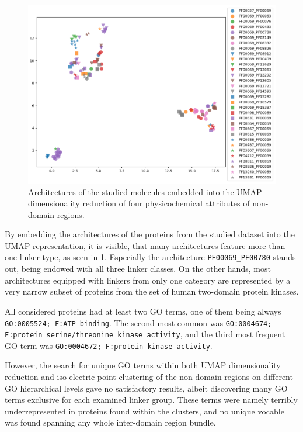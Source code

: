 		\begin{figure}
			\centering
			\includegraphics[width=0.9\linewidth]{img/linker_umap_arch.png}
			\caption{Architectures of the studied molecules embedded into the UMAP
			dimensionality reduction of four physicochemical attributes of non-domain regions.}
			\label{fig:umap_arch}
		\end{figure}

		By embedding the architectures of the proteins from the studied dataset into the UMAP
		representation, it is visible, that many architectures feature more than one linker
		type, as seen in \cref{fig:umap_arch}.
		Especially the architecture \texttt{PF00069\_PF00780} stands out, being endowed with
		all three linker classes.
		On the other hands, most architectures equipped with linkers from only one category
		are represented by a very narrow subset of proteins from the set of human two-domain
		protein kinases.

	\label{res:first:go}

		All considered proteins had at least two GO terms, one of them being always
		\texttt{GO:0005524; F:ATP binding}.
		The second most common was \texttt{GO:0004674; F:protein serine/threonine kinase
		activity}, and the third most frequent GO term was \texttt{GO:0004672; F:protein
		kinase activity}.

		However, the search for unique GO terms within both UMAP dimensionality reduction and
		iso-electric point clustering of the non-domain regions on different GO hierarchical
		levels gave no satisfactory results, albeit discovering many GO terms exclusive for
		each examined linker group.
		These terms were namely terribly underrepresented in proteins found within the
		clusters, and no unique vocable was found spanning any whole inter-domain region
		bundle.

